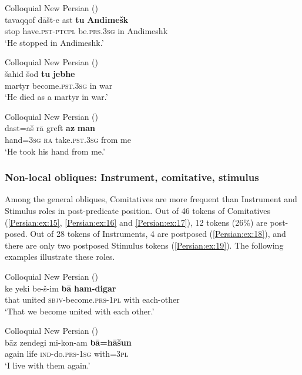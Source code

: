 \documentclass[output=paper,colorlinks,citecolor=brown,draftmode]{langscibook}
\begin{document}
\ea\label{Persian:ex:12}
Colloquial New Persian (\citealt[W, 2447]{Izadi2022Persian}) \\
\gll tavaqqof dāšt-e ast \textbf{tu} \textbf{Andimešk} \\
stop have\textsc{.pst-ptcpl} be\textsc{.prs.3sg} in {A}ndimeshk \\
\glt `He stopped in Andimeshk.'
\z

\ea\label{Persian:ex:13}
Colloquial New Persian (\citealt[W, 2487]{Izadi2022Persian}) \\
\gll šahid šod \textbf{tu} \textbf{jebhe} \\
martyr become\textsc{.pst.3sg} in war \\
\glt `He died as a martyr in war.'
\z

\ea\label{Persian:ex:14}
Colloquial New Persian (\citealt[Q, 1912]{Izadi2022Persian}) \\
\gll dast=aš rā greft \textbf{az} \textbf{man} \\
hand\textsc{=3sg} \textsc{ra} take\textsc{.pst.3sg} from me \\
\glt `He took his hand from me.'
\z

\subsubsection{Non-local obliques: Instrument, comitative, stimulus}

Among the general obliques, Comitatives are more frequent than Instrument and Stimulus roles in post-predicate position. Out of 46 tokens of Comitatives (\ref{Persian:ex:15},  \ref{Persian:ex:16} and \ref{Persian:ex:17}), 12 tokens (26\%) are post-posed. 
Out of 28 tokens of Instruments, 4 are postposed (\ref{Persian:ex:18}), and there are only two postposed Stimulus tokens (\ref{Persian:ex:19}). The following examples illustrate these roles.

\ea\label{Persian:ex:15}
Colloquial New Persian (\citealt[N, 1694]{Izadi2022Persian}) \\
\gll ke yeki be-š-im \textbf{bā} \textbf{ham-digar} \\
that united \textsc{sbjv-}become\textsc{.prs-1pl} with each-other \\
\glt `That we become united with each other.'
\z

\ea\label{Persian:ex:16}
Colloquial New Persian (\citealt[N, 1699]{Izadi2022Persian}) \\
\gll bāz zendegi mi-kon-am \textbf{bā=hāšun} \\
again life \textsc{ind-}do\textsc{.prs-1sg} with\textsc{=3pl} \\
\glt `I live with them again.'
\z
\end{document}
